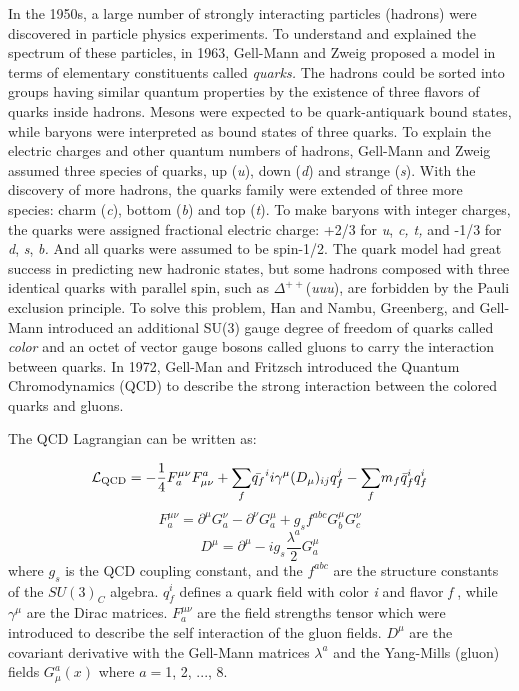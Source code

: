In the 1950s, a large number of strongly interacting particles (hadrons)
were discovered in particle physics experiments. To understand and
explained the spectrum of these particles, in 1963, Gell-Mann and
Zweig proposed a model in terms of elementary constituents called
\emph{quarks. }The hadrons could be sorted into groups having similar
quantum properties by the existence of three flavors of quarks inside
hadrons. Mesons were expected to be quark-antiquark bound states,
while baryons were interpreted as bound states of three quarks. To
explain the electric charges and other quantum numbers of hadrons,
Gell-Mann and Zweig assumed three species of quarks, up (\emph{u}),
down (\emph{d}) and strange (\emph{s}). With the discovery of more
hadrons, the quarks family were extended of three more species: charm
(\emph{c}), bottom (\emph{b}) and top (\emph{t}). To make baryons
with integer charges, the quarks were assigned fractional electric
charge: +2/3 for \emph{u}, \emph{c, t, }and -1/3 for \emph{d}, \emph{s},
\emph{b. }And all quarks were assumed to be spin-1/2. The quark model
had great success in predicting new hadronic states, but some hadrons
composed with three identical quarks with parallel spin, such as $\varDelta^{++}$(\emph{uuu}),
are forbidden by the Pauli exclusion principle. To solve this problem,
Han and Nambu, Greenberg, and Gell-Mann introduced an additional SU(3)
gauge degree of freedom of quarks called \emph{color }and an octet
of vector gauge bosons called gluons to carry the interaction between
quarks. In 1972, Gell-Man and Fritzsch introduced the Quantum Chromodynamics
(QCD) to describe the strong interaction between the colored quarks
and gluons.

The QCD Lagrangian can be written as:

\begin{equation}
\mathcal{L_{{\rm QCD}}}=-\frac{1}{4}F_{a}^{\mu\nu}F_{\mu\nu}^{a}+\underset{f}{\sum}\bar{q_{f}}^{i}i\gamma^{\mu}(D_{\mu})_{ij}q_{f}^{j}-\underset{f}{\sum}m_{f}\bar{q}_{f}^{i}q_{f}^{i}\label{eq:LQCD}
\end{equation}
\begin{equation}
F_{a}^{\mu\nu}=\partial^{\mu}G_{a}^{\nu}-\partial^{\nu}G_{a}^{\mu}+g_{s}f^{abc}G_{b}^{\mu}G_{c}^{\nu}\label{eq:fieldStr}
\end{equation}
\begin{equation}
D^{\mu}=\partial^{\mu}-ig_{s}\frac{\lambda^{a}}{2}G_{a}^{\mu}\label{eq:cd}
\end{equation}
where $g_{s}$ is the QCD coupling constant, and the $f^{abc}$ are
the structure constants of the $SU(3)_{C}$ algebra. $q_{f}^{i}$
defines a quark field with color \emph{i} and flavor \emph{f }, while
$\gamma^{\mu}$ are the Dirac matrices. $F_{a}^{\mu\nu}$ are the
field strengths tensor which were introduced to describe the self
interaction of the gluon fields. $D^{\mu}$ are the covariant derivative
with the Gell-Mann matrices $\lambda^{a}$ and the Yang-Mills (gluon)
fields $G_{\mu}^{a}(x)$ where $a=$1, 2, ..., 8.


